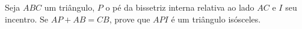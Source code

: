 Seja $ABC$ um  triângulo, $P$ o pé da bissetriz interna relativa ao lado $AC$ e $I$ seu incentro.
Se $AP + AB = CB$, prove que $API$ é um triângulo isósceles.